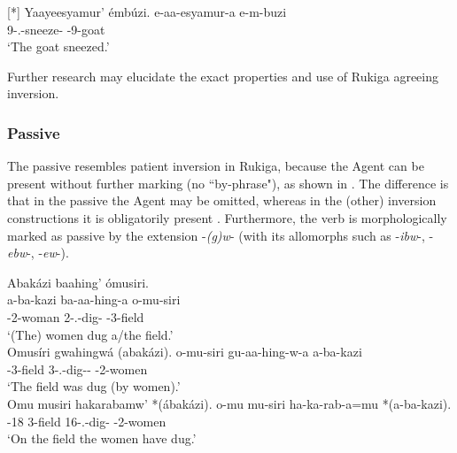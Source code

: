 \documentclass[output=paper]{langscibook}
\begin{document}
\ex
[*]{
\label{bkm:Ref113453625:b}
Yaayeesyamur’ émbúzi.  \jambox*{[with TR]}
\gll
e-aa-esyamur-a  e-m-buzi\\
9\SM{}-\N{}.\PST{}-sneeze-\FV{}  \AUG{}-9-goat\\
\glt
‘The goat sneezed.’\\
}


\z
\z

Further research may elucidate the exact properties and use of Rukiga agreeing inversion.

\subsubsection{Passive}
\label{bkm:Ref111461978}
The passive resembles patient inversion in Rukiga, because the Agent can be present without further marking (no ``by-phrase"), as shown in . The difference is that in the passive the Agent may be omitted, whereas in the (other) inversion constructions it is obligatorily present . Furthermore, the verb is morphologically marked as passive by the extension -\textit{(g)w}- (with its allomorphs such as -\textit{ibw}-, -\textit{ebw}-, -\textit{ew}-).

\ea
\label{bkm:Ref113453727}
\ea
\label{bkm:Ref113453727:a}
Abakázi baahing’ ómusiri.\\
\gll
a-ba-kazi  ba-aa-hing-a  o-mu-siri\\
\AUG{}-2-woman  2\SM{}-\N{}.\PST{}-dig-\FV{}  \AUG{}-3-field\\
\glt
‘(The) women dug a/the field.’\\

\ex
\label{bkm:Ref113453727:b}
Omusíri gwahingwá (abakázi).    \jambox*{[passive]}
\gll
o-mu-siri  gu-aa-hing-w-a  a-ba-kazi\\
\AUG{}-3-field  3\SM{}-\N{}.\PST{}-dig-\PASS{}-\FV{}  \AUG{}-2-women\\
\glt
‘The field was dug (by women).’\\

\ex
\label{bkm:Ref113453727:c}
Omu musiri hakarabamw’ *(ábakázi).  \jambox*{[LI]}
\gll
o-mu  mu-siri  ha-ka-rab-a=mu  *(a-ba-kazi).\\
\AUG{}-18{}  3-field  16\SM{}-\F{}.\PST{}-dig-\FV{}  \AUG{}-2-women\\
\glt
‘On the field the women have dug.’\\
\end{document}
